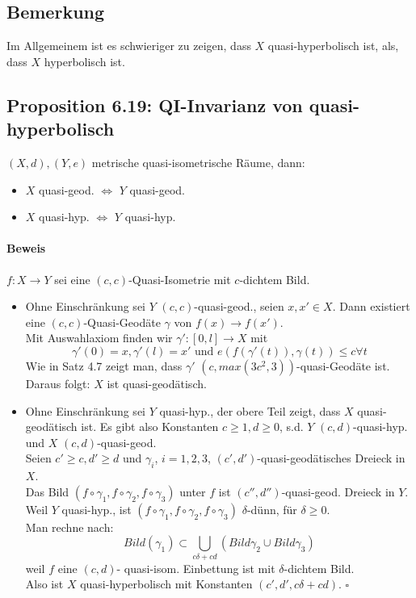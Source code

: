 \documentclass{article}
\newcommand{\qed}{$\square$}
\begin{document}
\subsection{Bemerkung}
Im Allgemeinem ist es schwieriger zu zeigen, dass $X$ quasi-hyperbolisch ist, als, dass $X$ hyperbolisch ist.

\subsection{Proposition 6.19: QI-Invarianz von quasi-hyperbolisch}
$(X,d), (Y, e)$ metrische quasi-isometrische Räume, dann:
\begin{itemize}
	\item $X$ quasi-geod. $\Longleftrightarrow$ $Y$ quasi-geod.
	\item $X$ quasi-hyp. $\Longleftrightarrow$ $Y$ quasi-hyp.
\end{itemize}



\paragraph{Beweis}
$f:X \rightarrow Y$ sei eine $(c,c)$-Quasi-Isometrie mit $c$-dichtem Bild.
\begin{itemize}
	\item Ohne Einschränkung sei $Y$  $(c,c)$-quasi-geod., seien $x,x'\in X$. Dann existiert eine $(c,c)$-Quasi-Geodäte $\gamma$ von $f(x)\rightarrow f(x')$.\\
	Mit Auswahlaxiom finden wir $\gamma':[0,l] \rightarrow X$ mit 
	\[\gamma'(0) = x, \gamma'(l)  = x' \text{ und } e(f(\gamma'(t)), \gamma(t)) \leq c \forall t \]
	Wie in Satz 4.7 zeigt man, dass $\gamma'$ $(c, max(3c^2, 3))$-quasi-Geodäte ist.\\
	Daraus folgt: $X$ ist quasi-geodätisch.
	
	\item Ohne Einschränkung sei $Y$  quasi-hyp., der obere Teil zeigt, dass $X$ quasi-geodätisch ist. Es gibt also Konstanten $c\geq 1, d \geq 0$, s.d. $Y$ $(c,d)$-quasi-hyp. und $X$ $(c,d)$-quasi-geod.\\
	Seien $c' \geq  c, d' \geq d$ und $\gamma_i$, $i = 1,2,3$, $(c',d')$-quasi-geodätisches Dreieck in $X$.\\
	Das Bild $(f\circ \gamma_1, f\circ \gamma_2, f\circ \gamma_3)$ unter $f$ ist $(c'', d'')$-quasi-geod. Dreieck in $Y$.\\
	Weil $Y$ quasi-hyp., ist $(f\circ \gamma_1, f\circ \gamma_2, f\circ \gamma_3 )$ $\delta$-dünn, für $\delta \geq 0$.\\
	Man rechne nach:
	\[Bild(\gamma_1) \subset \bigcup_{c\delta + cd}(Bild\gamma_2 \cup Bild \gamma_3) \]
	weil $f$ eine $(c,d)$- quasi-isom. Einbettung ist mit $\delta$-dichtem Bild.\\
	Also ist $X$ quasi-hyperbolisch mit Konstanten $(c', d', c\delta + cd)$. \qed
\end{itemize}
\end{document}
